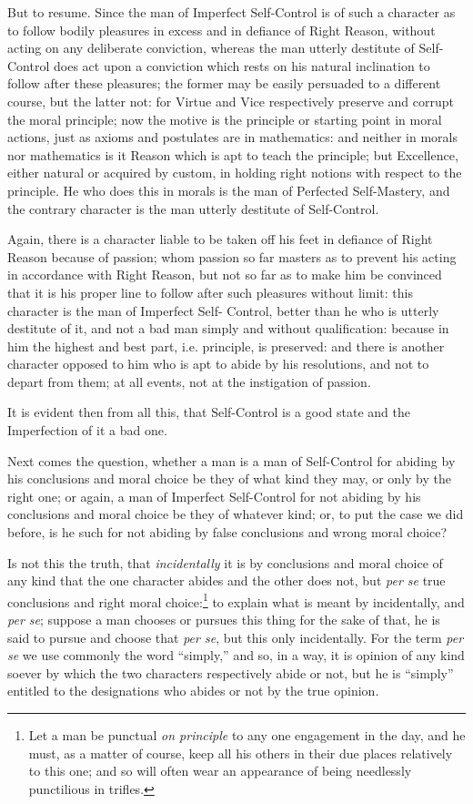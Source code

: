 But to resume. Since the man of Imperfect Self-Control is of such a character
as to follow bodily pleasures in excess and in defiance of Right Reason,
without acting on any deliberate conviction, whereas the man utterly destitute
of Self-Control does act upon a conviction which rests on his natural
inclination to follow after these pleasures; the former may be easily persuaded
to a different course, but the latter not: for Virtue and Vice respectively
preserve and corrupt the moral principle; now the motive is the principle or
starting point in moral actions, just as axioms and postulates are in
mathematics: and neither in morals nor mathematics is it Reason which is apt to
teach the principle; but Excellence, either natural or acquired by custom, in
holding right notions with respect to the principle. He who does this in morals
is the man of Perfected Self-Mastery, and the contrary character is the man
utterly destitute of Self-Control.

Again, there is a character liable to be taken off his feet in defiance of
Right Reason because of passion; whom passion so far masters as to prevent his
acting in accordance with Right Reason, but not so far as to make him be
convinced that it is his proper line to follow after such pleasures without
limit: this character is the man of Imperfect Self- Control, better than he who
is utterly destitute of it, and not a bad man simply and without qualification:
because in him the highest and best part, i.e. principle, is preserved: and
there is another character opposed to him who is apt to abide by his
resolutions, and not to depart from them; at all events, not at the instigation
of passion.

It is evident then from all this, that Self-Control is a good state and the
Imperfection of it a bad one.


Next comes the question, whether a man is a man of Self-Control for abiding by
his conclusions and moral choice be they of what kind they may, or only by the
right one; or again, a man of Imperfect Self-Control for not abiding by his
conclusions and moral choice be they of whatever kind; or, to put the case we
did before, is he such for not abiding by false conclusions and wrong moral
choice?

Is not this the truth, that \emph{incidentally} it is by conclusions and moral
choice of any kind that the one character abides and the other does not, but
\emph{per se} true conclusions and right moral choice:\footnote{Let a man be punctual \emph{on principle} to any one engagement in the day, and
he must, as a matter of course, keep all his others in their due places
relatively to this one; and so will often wear an appearance of being
needlessly punctilious in trifles.}
to explain what is meant by incidentally, and \emph{per se}; suppose a man
chooses or pursues this thing for the sake of that, he is said to pursue and
choose that \emph{per se}, but this only incidentally. For the term \emph{per
se} we use commonly the word “simply,” and so, in a way, it is
opinion of any kind soever by which the two characters respectively abide or
not, but he is “simply” entitled to the designations who abides or
not by the true opinion.

